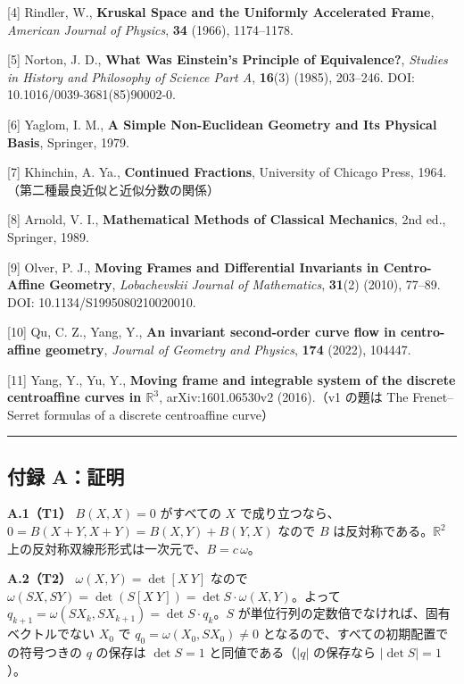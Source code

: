 \documentclass[
  a4paper,
]{ltjsarticle}
\begin{document}
{[}4{]} Rindler, W., \textbf{Kruskal Space and the Uniformly Accelerated
Frame}, \emph{American Journal of Physics}, \textbf{34} (1966),
1174--1178.

{[}5{]} Norton, J. D., \textbf{What Was Einstein's Principle of
Equivalence?}, \emph{Studies in History and Philosophy of Science Part
A}, \textbf{16}(3) (1985), 203--246. DOI: 10.1016/0039-3681(85)90002-0.

{[}6{]} Yaglom, I. M., \textbf{A Simple Non-Euclidean Geometry and Its
Physical Basis}, Springer, 1979.

{[}7{]} Khinchin, A. Ya., \textbf{Continued Fractions}, University of
Chicago Press, 1964.（第二種最良近似と近似分数の関係）

{[}8{]} Arnold, V. I., \textbf{Mathematical Methods of Classical
Mechanics}, 2nd ed., Springer, 1989.

{[}9{]} Olver, P. J., \textbf{Moving Frames and Differential Invariants
in Centro-Affine Geometry}, \emph{Lobachevskii Journal of Mathematics},
\textbf{31}(2) (2010), 77--89. DOI: 10.1134/S1995080210020010.

{[}10{]} Qu, C. Z., Yang, Y., \textbf{An invariant second-order curve
flow in centro-affine geometry}, \emph{Journal of Geometry and Physics},
\textbf{174} (2022), 104447.

{[}11{]} Yang, Y., Yu, Y., \textbf{Moving frame and integrable system of
the discrete centroaffine curves in \(\mathbb R^3\)}, arXiv:1601.06530v2
(2016).（v1 の題は The Frenet--Serret formulas of a discrete
centroaffine curve）

\begin{center}\rule{0.5\linewidth}{0.5pt}\end{center}

\subsection{付録 A：証明}\label{ux4ed8ux9332-aux8a3cux660e}

\textbf{A.1（T1）} \(B(X,X)=0\) がすべての \(X\)
で成り立つなら、\(0=B(X+Y,X+Y)=B(X,Y)+B(Y,X)\) なので \(B\)
は反対称である。\(\mathbb R^2\)
上の反対称双線形形式は一次元で、\(B=c\,\omega\)。

\textbf{A.2（T2）} \(\omega(X,Y)=\det[X\ Y]\) なので
\(\omega(SX,SY)=\det(S[X\ Y])=\det S\cdot\omega(X,Y)\)。よって
\(q_{k+1}=\omega(SX_k,SX_{k+1})=\det S\cdot q_k\)。\(S\)
が単位行列の定数倍でなければ、固有ベクトルでない \(X_0\) で
\(q_0=\omega(X_0,SX_0)\neq0\) となるので、すべての初期配置での符号つきの
\(q\) の保存は \(\det S=1\) と同値である（\(\lvert q\rvert\) の保存なら
\(\lvert\det S\rvert=1\)）。
\end{document}
